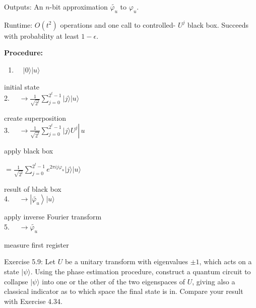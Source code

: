Outputs: An $n$-bit approximation $\widetilde{\varphi_{u}}$ to $\varphi_{u}$.

Runtime: $O\left(t^{2}\right)$ operations and one call to controlled- $U^{j}$ black box. Succeeds with probability at least $1-\epsilon$.

\textbf{Procedure:}
\begin{enumerate}
    \item $\quad|0\rangle|u\rangle$
\end{enumerate}

initial state\\
2. $\quad \rightarrow \frac{1}{\sqrt{2^{t}}} \sum_{j=0}^{2^{t}-1}|j\rangle|u\rangle$

create superposition\\
3. $\left.\quad \rightarrow \frac{1}{\sqrt{2^{t}}} \sum_{j=0}^{2^{t}-1}|j\rangle U^{j} \right\rvert\, u$

apply black box

$=\frac{1}{\sqrt{2^{t}}} \sum_{j=0}^{2^{t}-1} e^{2 \pi i j \varphi_{u}}|j\rangle|u\rangle$

result of black box\\
4. $\quad \rightarrow\left|\widetilde{\varphi_{u}}\right\rangle|u\rangle$

apply inverse Fourier transform\\
5. $\quad \rightarrow \widetilde{\varphi_{u}}$

measure first register

Exercise 5.9: Let $U$ be a unitary transform with eigenvalues $\pm 1$, which acts on a state $|\psi\rangle$. Using the phase estimation procedure, construct a quantum circuit to collapse $|\psi\rangle$ into one or the other of the two eigenspaces of $U$, giving also a\\
classical indicator as to which space the final state is in. Compare your result with Exercise 4.34.